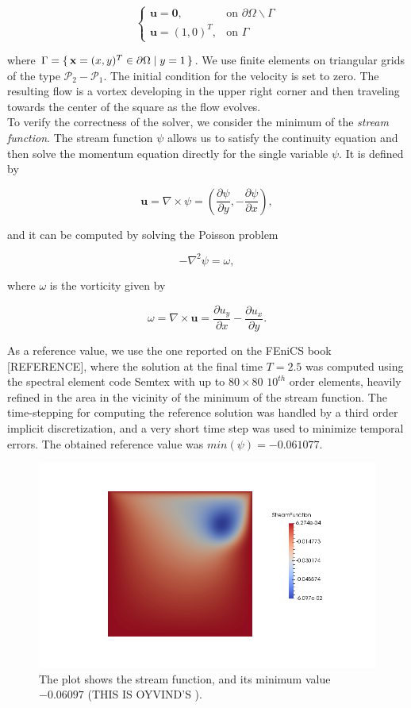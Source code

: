 \documentclass[11pt,a4paper,titlepage]{report}
\begin{document}
\[
\begin{cases}
\mathbf{u = 0}, & \mbox{on } \partial \Omega \backslash \Gamma \\
\mathbf{u} = (1,0)^T, & \mbox{on } \Gamma
\end{cases}
\]

where $ \Gamma = \set{ \mathbf{x} = (x,y)^T \in \partial \Omega | y = 1}$. We use finite elements on triangular grids of the type $\mathcal{P}_2-\mathcal{P}_1$. The initial condition for the velocity is set to zero. The resulting flow is a vortex developing in the upper right corner and then traveling towards the center of the square as the flow evolves. \\
To verify the correctness of the solver, we consider the minimum of the \textit{stream function}. The stream function $\psi$ allows us to satisfy the continuity equation and then solve the momentum equation directly for the single variable $\psi$. It is defined by

\[
\mathbf{u} = \nabla \times \psi = (\frac{\partial \psi}{\partial y} , - \frac{\partial \psi }{\partial x}),
\]

and it can be computed by solving the Poisson problem

\[
- \nabla^2 \psi = \omega,
\]

where $\omega$ is the vorticity given by

\[
\omega = \nabla \times \mathbf{u} = \frac{\partial u_y}{\partial x} - \frac{\partial u_x}{\partial y}.
\]


As a reference value, we use the one reported on the FEniCS book [REFERENCE], where the solution at the final time $T = 2.5$ was computed using the spectral element code Semtex with up to $80 \times 80$ $10^{th}$ order elements, heavily refined in the area in the vicinity of the minimum of the stream function. The time-stepping for computing the reference solution was handled by a third order implicit discretization, and a very short time step was used to minimize temporal errors.  The obtained reference value was $min(\psi) = -0.061 077$. 

\begin{figure}[ht]
\centering
\includegraphics[width=\textwidth]{images/oyvind.png}
\vspace{-1cm}
\caption{The plot shows the stream function, and its minimum value $-0.06097$ (THIS IS OYVIND'S ).}
\end{figure}
\end{document}
